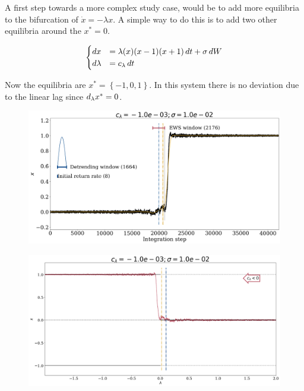 A first step towards a more complex study case, would be to add more equilibria to the bifurcation of $\dot{x}=-\lambda x$. A simple way to do this is to add two other equilibria around the $x^*=0$. 

\begin{equation}
	\begin{cases}
			dx &=\lambda(x)(x-1)(x+1)\, dt +\sigma \, dW\\
		d\lambda&=c_\lambda \, dt
	\end{cases}
	\label{eq:ASScustom}
\end{equation}

Now the equilibria are  $x^*=\left\lbrace -1,0,1 \right\rbrace $. In this system there is no deviation due to the linear lag since $d_\lambda x^*=0$. 


\begin{figure}
	\centering
	\includegraphics[width=0.8\linewidth]{Images/Metrics/custom_bifurcation/detrend_additive}
	\caption{}
	\label{fig:detrendadditive}
\end{figure}

\begin{figure}
	\centering
	\includegraphics[width=0.8\linewidth]{Images/Metrics/custom_bifurcation/bifurcation_additive}
	\caption{}
	\label{fig:bifurcationadditive}
\end{figure}



